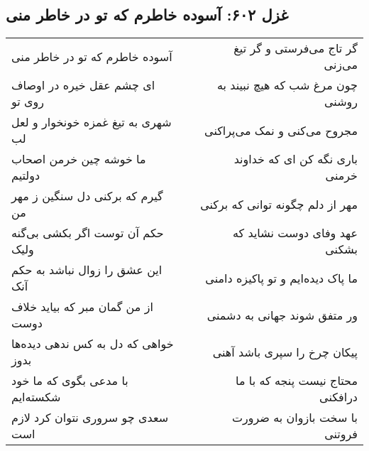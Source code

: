 \begin{center}
\section*{غزل ۶۰۲: آسوده خاطرم که تو در خاطر منی}
\label{sec:602}
\begin{longtable}{l p{0.5cm} r}
آسوده خاطرم که تو در خاطر منی
&&
گر تاج می‌فرستی و گر تیغ می‌زنی
\\
ای چشم عقل خیره در اوصاف روی تو
&&
چون مرغ شب که هیچ نبیند به روشنی
\\
شهری به تیغ غمزه خونخوار و لعل لب
&&
مجروح می‌کنی و نمک می‌پراکنی
\\
ما خوشه چین خرمن اصحاب دولتیم
&&
باری نگه کن ای که خداوند خرمنی
\\
گیرم که برکنی دل سنگین ز مهر من
&&
مهر از دلم چگونه توانی که برکنی
\\
حکم آن توست اگر بکشی بی‌گنه ولیک
&&
عهد وفای دوست نشاید که بشکنی
\\
این عشق را زوال نباشد به حکم آنک
&&
ما پاک دیده‌ایم و تو پاکیزه دامنی
\\
از من گمان مبر که بیاید خلاف دوست
&&
ور متفق شوند جهانی به دشمنی
\\
خواهی که دل به کس ندهی دیده‌ها بدوز
&&
پیکان چرخ را سپری باشد آهنی
\\
با مدعی بگوی که ما خود شکسته‌ایم
&&
محتاج نیست پنجه که با ما درافکنی
\\
سعدی چو سروری نتوان کرد لازم است
&&
با سخت بازوان به ضرورت فروتنی
\\
\end{longtable}
\end{center}
